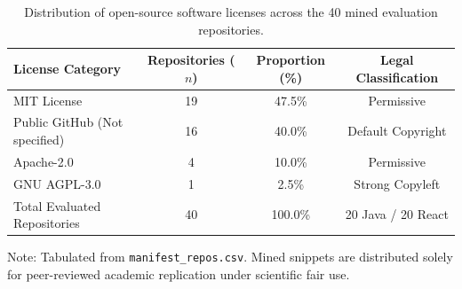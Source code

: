 \begin{table}[t]
\caption{Distribution of open-source software licenses across the 40 mined evaluation repositories.}
\label{tab:manifest_repos_licensing}
\centering\footnotesize
\setlength{\tabcolsep}{12pt}
\begin{threeparttable}
\begin{tabular}{@{}lccc@{}}
\toprule
License Category & Repositories ($n$) & Proportion (\%) & Legal Classification \\
\midrule
MIT License & 19 & 47.5\% & Permissive \\
Public GitHub (Not specified) & 16 & 40.0\% & Default Copyright \\
Apache-2.0 & 4 & 10.0\% & Permissive \\
GNU AGPL-3.0 & 1 & 2.5\% & Strong Copyleft \\
\midrule
Total Evaluated Repositories & 40 & 100.0\% & 20 Java / 20 React \\
\bottomrule
\end{tabular}
\begin{tablenotes}\footnotesize
\item[] Note: Tabulated from \texttt{manifest\_repos.csv}. Mined snippets are distributed solely for peer-reviewed academic replication under scientific fair use.
\end{tablenotes}
\end{threeparttable}
\end{table}